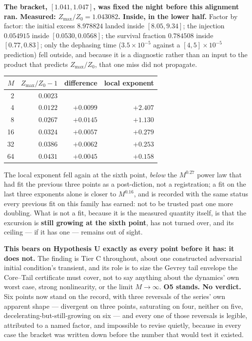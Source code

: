 \documentclass[11pt,a4paper]{article}
\theoremstyle{definition}
\theoremstyle{plain}
\begin{document}
\textbf{The bracket, $[1.041,1.047]$, was fixed the night before this alignment ran. Measured:
$Z_{\max}/Z_0=1.043082$. Inside, in the lower half.} Factor by factor: the initial excess
$8.978824$ landed inside $[8.05,9.34]$; the injection $0.054915$ inside $[0.0530,0.0568]$; the
survival fraction $0.784508$ inside $[0.77,0.83]$; only the dephasing time
($3.5\times10^{-5}$ against a $[4,5]\times10^{-5}$ prediction) fell outside, and because it is a
diagnostic rather than an input to the product that predicts $Z_{\max}/Z_0$, that one miss did
not propagate.

\begin{center}
\small
\begin{tabular}{@{}rrrr@{}}
\toprule
$M$ & $Z_{\max}/Z_0-1$ & difference & local exponent \\
\midrule
2  & $0.0023$ & & \\
4  & $0.0122$ & $+0.0099$ & $+2.407$ \\
8  & $0.0267$ & $+0.0145$ & $+1.130$ \\
16 & $0.0324$ & $+0.0057$ & $+0.279$ \\
32 & $0.0386$ & $+0.0062$ & $+0.253$ \\
64 & $\mathbf{0.0431}$ & $+0.0045$ & $\mathbf{+0.158}$ \\
\bottomrule
\end{tabular}
\end{center}

The local exponent fell again at the sixth point, \emph{below} the $M^{0.27}$ power law that
had fit the previous three points as a post-diction, not a registration; a fit on the last
three exponents alone is closer to $M^{0.16}$, and is recorded with the same status every
previous fit on this family has earned: not to be trusted past one more doubling. What is not a
fit, because it is the measured quantity itself, is that the excursion is \textbf{still growing
at the sixth point}, has not turned over, and its ceiling --- if it has one --- remains out
of sight.

\textbf{This bears on Hypothesis U exactly as every point before it has: it does not.} The
finding is Tier C throughout, about one constructed adversarial initial condition's transient,
and its role is to size the Gevrey tail envelope the Core--Tail certificate must cover, not to
say anything about the dynamics' own worst case, strong nonlinearity, or the limit
$M\to\infty$. \textbf{O5 stands. No verdict.} Six points now stand on the record, with three
reversals of the series' own apparent shape --- divergent on three points, saturating on four,
neither on five, decelerating-but-still-growing on six --- and every one of those reversals is
legible, attributed to a named factor, and impossible to revise quietly, because in every case
the bracket was written down before the number that would test it existed.
\end{document}
